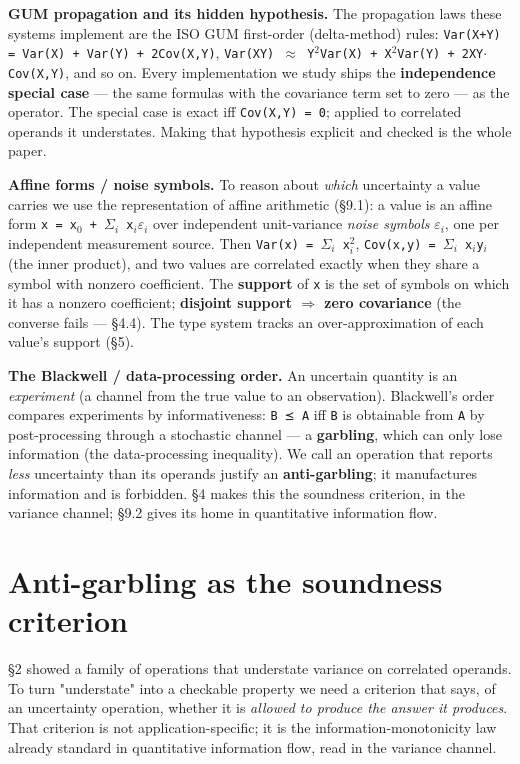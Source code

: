 \documentclass[sigplan,review,anonymous,10pt]{acmart}
\begin{document}
\textbf{GUM propagation and its hidden hypothesis.} The propagation laws these systems implement are the ISO GUM first-order (delta-method) rules: \texttt{Var(X+Y) = Var(X) + Var(Y) + 2Cov(X,Y)}, \texttt{Var(XY) $\approx$ Y$^{2}$Var(X) + X$^{2}$Var(Y) + 2XY$\cdot$Cov(X,Y)}, and so on. Every implementation we study ships the \textbf{independence special case} --- the same formulas with the covariance term set to zero --- as the operator. The special case is exact iff \texttt{Cov(X,Y) = 0}; applied to correlated operands it understates. Making that hypothesis explicit and checked is the whole paper.

\textbf{Affine forms / noise symbols.} To reason about \emph{which} uncertainty a value carries we use the representation of affine arithmetic (§9.1): a value is an affine form \texttt{x = x$_{0}$ + $\Sigma_{i}$ x$_{i}\varepsilon_{i}$} over independent unit-variance \emph{noise symbols} \texttt{$\varepsilon_{i}$}, one per independent measurement source. Then \texttt{Var(x) = $\Sigma_{i}$ x$_{i}^{2}$}, \texttt{Cov(x,y) = $\Sigma_{i}$ x$_{i}$y$_{i}$} (the inner product), and two values are correlated exactly when they share a symbol with nonzero coefficient. The \textbf{support} of \texttt{x} is the set of symbols on which it has a nonzero coefficient; \textbf{disjoint support $\Rightarrow$ zero covariance} (the converse fails --- §4.4). The type system tracks an over-approximation of each value's support (§5).

\textbf{The Blackwell / data-processing order.} An uncertain quantity is an \emph{experiment} (a channel from the true value to an observation). Blackwell's order compares experiments by informativeness: \texttt{B ⪯ A} iff \texttt{B} is obtainable from \texttt{A} by post-processing through a stochastic channel --- a \textbf{garbling}, which can only lose information (the data-processing inequality). We call an operation that reports \emph{less} uncertainty than its operands justify an \textbf{anti-garbling}; it manufactures information and is forbidden. §4 makes this the soundness criterion, in the variance channel; §9.2 gives its home in quantitative information flow.

\section{Anti-garbling as the soundness criterion}

§2 showed a family of operations that understate variance on correlated operands. To turn "understate" into a checkable property we need a criterion that says, of an uncertainty operation, whether it is \emph{allowed to produce the answer it produces}. That criterion is not application-specific; it is the information-monotonicity law already standard in quantitative information flow, read in the variance channel.
\end{document}
